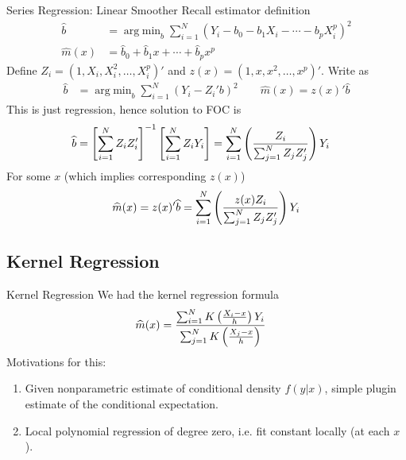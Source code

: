 \documentclass[aspectratio=169, handout]{beamer}
\DeclareMathOperator*{\argmin}{arg\;min}
\newcommand{\sumiN}{\sum^N_{i=1}}
\begin{document}
{\footnotesize
\begin{frame}{Series Regression: Linear Smoother}
Recall estimator definition
\begin{align*}
  \widehat{b}
  &=
  \argmin_b
  \sumiN
  (Y_i-b_0-b_1X_i-\cdots-b_pX_i^p)^2
  \\
  \widehat{m}(x)
  &=
  \widehat{b}_0
  +
  \widehat{b}_1
  x
  +
  \cdots+
  \widehat{b}_p
  x^p
\end{align*}
\pause
Define $Z_i=(1,X_i,X_i^2,\ldots,X_i^p)'$
and $z(x) = (1,x,x^2,\ldots,x^p)'$.
Write as
\begin{align*}
  \widehat{b}
  &=
  \argmin_b
  \sumiN
  (Y_i-Z_i'b)^2
  \qquad
  \widehat{m}(x)
  =
  z(x)'\widehat{b}
\end{align*}
\pause
This is just regression, hence solution to FOC is
\begin{align*}
  \widehat{b}
  &=
  \left[
  \sumiN
  Z_iZ_i'
  \right]^{-1}
  \left[
  \sumiN
  Z_iY_i
  \right]
  =
  \sumiN
  \left(
  \frac{%
    Z_i
  }{%
    \sum_{j=1}^N
    Z_jZ_j'
  }
  \right)
  Y_i
\end{align*}
\pause
For some $x$ (which implies corresponding $z(x)$)
\begin{align*}
  \widehat{m}(x)
  =
  z(x)'
  \widehat{b}
  =
  \sumiN
  \left(
  \frac{%
    z(x)Z_i
  }{%
    \sum_{j=1}^N
    Z_jZ_j'
  }
  \right)
  Y_i
\end{align*}
\end{frame}
}




\subsection{Kernel Regression}


{\footnotesize
\begin{frame}{Kernel Regression}
We had the kernel regression formula
\begin{align*}
  \widehat{m}(x)
  &=
  \frac{%
    \sumiN
    K\left(
    \frac{X_i-x}{h}
    \right)
    Y_i
  }{%
    \sum_{j=1}^N
    K\left(
    \frac{X_j-x}{h}
    \right)
  }
\end{align*}
Motivations for this:
\begin{enumerate}
  \item Given nonparametric estimate of \alert{conditional density}
    $f(y|x)$, simple \alert{plugin} estimate of the
    \alert{conditional expectation}.
  \item Local polynomial regression of degree zero, i.e.
    \alert{fit constant locally} (at each $x$).
\end{enumerate}
\end{frame}
}
\end{document}
